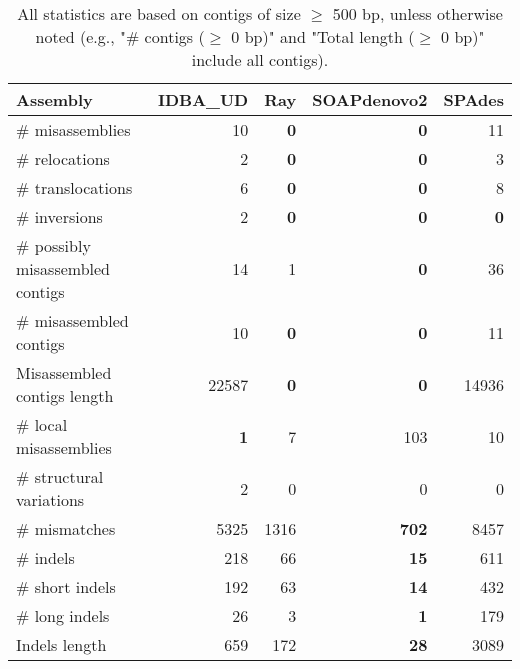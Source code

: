 \documentclass[12pt,a4paper]{article}
\begin{document}
\begin{table}[ht]
\begin{center}
\caption{All statistics are based on contigs of size $\geq$ 500 bp, unless otherwise noted (e.g., "\# contigs ($\geq$ 0 bp)" and "Total length ($\geq$ 0 bp)" include all contigs).}
\begin{tabular}{|l*{4}{|r}|}
\hline
Assembly & IDBA\_UD & Ray & SOAPdenovo2 & SPAdes \\ \hline
\# misassemblies & 10 & {\bf 0} & {\bf 0} & 11 \\ \hline
\hspace{5mm}\# relocations & 2 & {\bf 0} & {\bf 0} & 3 \\ \hline
\hspace{5mm}\# translocations & 6 & {\bf 0} & {\bf 0} & 8 \\ \hline
\hspace{5mm}\# inversions & 2 & {\bf 0} & {\bf 0} & {\bf 0} \\ \hline
\# possibly misassembled contigs & 14 & 1 & {\bf 0} & 36 \\ \hline
\# misassembled contigs & 10 & {\bf 0} & {\bf 0} & 11 \\ \hline
Misassembled contigs length & 22587 & {\bf 0} & {\bf 0} & 14936 \\ \hline
\# local misassemblies & {\bf 1} & 7 & 103 & 10 \\ \hline
\# structural variations & 2 & 0 & 0 & 0 \\ \hline
\# mismatches & 5325 & 1316 & {\bf 702} & 8457 \\ \hline
\# indels & 218 & 66 & {\bf 15} & 611 \\ \hline
\hspace{5mm}\# short indels & 192 & 63 & {\bf 14} & 432 \\ \hline
\hspace{5mm}\# long indels & 26 & 3 & {\bf 1} & 179 \\ \hline
Indels length & 659 & 172 & {\bf 28} & 3089 \\ \hline
\end{tabular}
\end{center}
\end{table}
\end{document}
